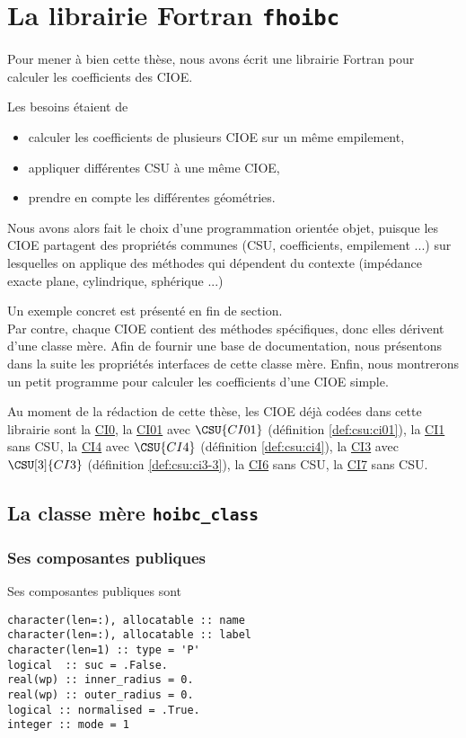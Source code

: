 \section[La librairie Fortran fhoibc]{La librairie Fortran \texttt{fhoibc}}
  Pour mener à bien cette thèse, nous avons écrit une librairie Fortran pour calculer les coefficients des CIOE.

  Les besoins étaient de
  \begin{itemize}
    \item calculer les coefficients de plusieurs CIOE sur un même empilement,
    \item appliquer différentes CSU à une même CIOE,
    \item prendre en compte les différentes géométries.
  \end{itemize}

  Nous avons alors fait le choix d'une programmation orientée objet, puisque les CIOE partagent des propriétés communes (CSU, coefficients, empilement ...) sur lesquelles on applique des méthodes qui dépendent du contexte (impédance exacte plane, cylindrique, sphérique ...)

  Un exemple concret est présenté en fin de section.\\

  Par contre, chaque CIOE contient des méthodes spécifiques, donc elles dérivent d'une classe mère. Afin de fournir une base de documentation, nous présentons dans la suite les propriétés interfaces de cette classe mère. Enfin, nous montrerons un petit programme pour calculer les coefficients d'une CIOE simple.

  Au moment de la rédaction de cette thèse, les CIOE déjà codées dans cette librairie sont
  la \hyperlink{ci0}{CI0},
  la \hyperlink{ci01}{CI01} avec \(\CSU{CI01}\) (définition \ref{def:csu:ci01}),
  la \hyperlink{ci1}{CI1} sans CSU,
  la \hyperlink{ci4}{CI4} avec \(\CSU{CI4}\) (définition \ref{def:csu:ci4}),
  la \hyperlink{ci3}{CI3} avec \(\CSU[3]{CI3}\) (définition \ref{def:csu:ci3-3}),
  la \hyperlink{ci6}{CI6} sans CSU,
  la \hyperlink{ci7}{CI7} sans CSU.

  \subsection[La classe mère hoibc_class]{La classe mère \lstinline{hoibc_class}}

    \subsubsection{Ses composantes publiques}
      Ses composantes publiques sont
\begin{lstlisting}
character(len=:), allocatable :: name
character(len=:), allocatable :: label
character(len=1) :: type = 'P'       
logical  :: suc = .False.            
real(wp) :: inner_radius = 0.        
real(wp) :: outer_radius = 0.        
logical :: normalised = .True.       
integer :: mode = 1                  
\end{lstlisting}

